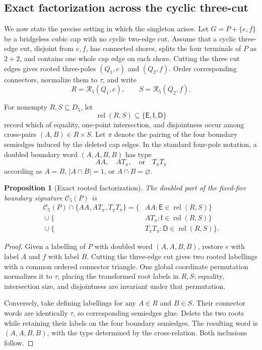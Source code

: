 \documentclass[11pt]{article}
\newtheorem{proposition}[theorem]{Proposition}
\theoremstyle{definition}
\theoremstyle{remark}
\begin{document}
\subsection{Exact factorization across the cyclic three-cut}

We now state the precise setting in which the singleton arises.  Let
\(G=P+\{e,f\}\) be a bridgeless cubic cap with no cyclic two-edge cut.
Assume that a cyclic three-edge cut, disjoint from \(e,f\), has connected
shores, splits the four terminals of \(P\) as \(2+2\), and contains one
whole cap edge on each shore.  Cutting the three cut edges gives rooted
three-poles \((Q_1,e)\) and \((Q_2,f)\).  Order corresponding connectors,
normalize them to \(\tau\), and write
\[
 R=\mathcal R_5(Q_1,e),\qquad S=\mathcal R_5(Q_2,f).
\]

For nonempty \(R,S\subseteq D_5\), let
\[
 \operatorname{rel}(R,S)\subseteq
 \{\mathsf E,\mathsf I,\mathsf D\}
\]
record which of equality, one-point intersection, and disjointness
occur among cross-pairs \((A,B)\in R\times S\).  Let \(\pi\) denote the
pairing of the four boundary semiedges induced by the deleted cap
edges.  In the standard four-pole notation, a doubled boundary word
\((A,A,B,B)\) has type
\[
 AA,\quad AT_\pi,\quad\text{or}\quad T_\pi T_\pi
\]
according as \(A=B\), \(|A\cap B|=1\), or \(A\cap B=\varnothing\).

\begin{proposition}[Exact rooted factorization]\label{prop:factorization}
The doubled part of the fixed-five boundary signature
\(\mathcal C_5(P)\) is
\[
\begin{split}
\mathcal C_5(P)\cap\{AA,AT_\pi,T_\pi T_\pi\}
 =\{&AA:\mathsf E\in\operatorname{rel}(R,S)\}\\
 {}\cup\{&AT_\pi:\mathsf I\in\operatorname{rel}(R,S)\}\\
 {}\cup\{&T_\pi T_\pi:
           \mathsf D\in\operatorname{rel}(R,S)\}.
\end{split}                                                \tag{6.7}
\]
\end{proposition}

\begin{proof}
Given a labelling of \(P\) with doubled word \((A,A,B,B)\), restore
\(e\) with label \(A\) and \(f\) with label \(B\).  Cutting the
three-edge cut gives two rooted labellings with a common ordered
connector triangle.  One global coordinate permutation normalizes it
to \(\tau\), placing the transformed root labels in \(R,S\); equality,
intersection size, and disjointness are invariant under that
permutation.

Conversely, take defining labellings for any \(A\in R\) and \(B\in S\).
Their connector words are identically \(\tau\), so corresponding
semiedges glue.  Delete the two roots while retaining their labels on
the four boundary semiedges.  The resulting word is
\((A,A,B,B)\), with the type determined by the cross-relation.  Both
inclusions follow.
\end{proof}
\end{document}
